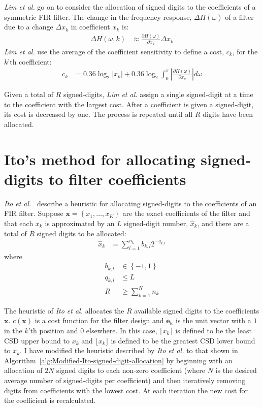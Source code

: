\documentclass[a4paper,twoside,10pt,english]{report}
\begin{document}
\emph{Lim et al.} go on to consider the allocation of signed digits to the
coefficients of a symmetric FIR filter. The change in the frequency response,
$\Delta{} H\left(\omega\right)$ of a filter due to a change $\Delta{}x_{k}$ in
coefficient $x_{k}$ is:
\begin{align*}
\Delta{} H\left(\omega,k\right)&  \approx
\frac{\partial{}H\left(\omega\right)}{\partial{}x_{k}}\Delta{}x_{k}
\end{align*}
\emph{Lim et al.} use the average of the coefficient sensitivity to define a
cost, $c_{k}$, for the $k$'th coefficient:
\begin{align*}
c_{k}&=0.36\log_{2}\left|x_{k}\right| + 0.36\log_{2}\int^{\pi}_{0}
\left|\frac{\partial{}H\left(\omega\right)}{\partial{}x_{k}}\right|d\omega
\end{align*}

Given a total of $R$ signed-digits, \emph{Lim et al.} assign a single 
signed-digit at a time to the coefficient with the largest cost. After a 
coefficient is given a signed-digit, its cost is decreased by one. The
process is repeated until all $R$ digits have been allocated.
\section{\label{sec:Ito-allocation-signed-digits}Ito's method for allocating signed-digits to filter coefficients}
\emph{Ito et al.}~\cite{Ito_PowersOfTwoAllocationFIR} describe a heuristic for
allocating signed-digits to the coefficients of an FIR filter. Suppose 
$\boldsymbol{x}=\left\{x_{1},\hdots,x_{K}\right\}$ are the
exact coefficients of the filter and that each $x_{k}$ is approximated by
an $L$ signed-digit number, $\hat{x}_{k}$, and there are a total of $R$ signed 
digits to be allocated:
\begin{align*}
\hat{x}_{k}&=\sum^{n_{k}}_{l=1}b_{k,l}2^{-q_{k,l}} 
\end{align*} 
where
\begin{align*}
b_{k,l}&\in\left\{-1,1\right\}\\
q_{k,l}&\le L\\
R&\ge\sum^{K}_{k=1}n_{k}
\end{align*} 

The heuristic of \emph{Ito et al.} allocates the
$R$ available signed digits to the coefficients $\boldsymbol{x}$. 
$c\left(\boldsymbol{x}\right)$ is a cost function for the filter design and
$\boldsymbol{e_{k}}$ is the unit vector with a $1$ in the $k$'th position and
$0$ elsewhere. In this case, $\lceil{}x_{k}\rceil$ is defined to be the least 
CSD upper bound to $x_{k}$ and $\lfloor{}x_{k}\rfloor$ is defined to be the 
greatest CSD lower bound to $x_{k}$. I have modified the heuristic described by 
\emph{Ito et al.} to that shown in 
Algorithm~\ref{alg:Modified-Ito-signed-digit-allocation} by
beginning with an allocation of $2N$ signed digits to each non-zero coefficient 
(where $N$ is the desired average number of signed-digits per coefficient) and
then iteratively removing digits from coefficients with the lowest cost. At
each iteration the new cost for the coefficient is recalculated.
\end{document}
